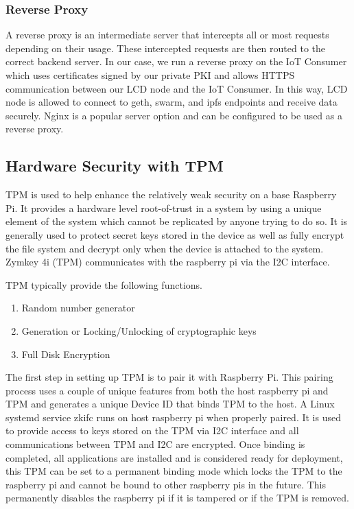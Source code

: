 \documentclass[11pt,openright]{report}
\begin{document}
\subsubsection{Reverse Proxy}
A reverse proxy is an intermediate server that intercepts all or most requests depending on their usage. These intercepted requests are then routed to the correct backend server. In our case, we run a reverse proxy on the IoT Consumer which uses certificates signed by our private PKI and allows HTTPS communication between our LCD node and the IoT Consumer. In this way, LCD node is allowed to connect to geth, swarm, and ipfs endpoints and receive data securely. Nginx is a popular server option and can be configured to be used as a reverse proxy.

\subsection{Hardware Security with TPM}
TPM is used to help enhance the relatively weak security on a base Raspberry Pi. It provides a hardware level root-of-trust in a system by using a unique element of the system which cannot be replicated by anyone trying to do so. It is generally used to protect secret keys stored in the device as well as fully encrypt the file system and decrypt only when the device is attached to the system. Zymkey 4i (TPM) communicates with the raspberry pi via the I2C interface.

TPM typically provide the following functions.
\begin{enumerate}
	\item Random number generator
	\item Generation or Locking/Unlocking of cryptographic keys
	\item Full Disk Encryption
\end{enumerate}

The first step in setting up TPM is to pair it with Raspberry Pi. This pairing process uses a couple of unique features from both the host raspberry pi and TPM and generates a unique Device ID that binds TPM to the host. A Linux systemd service zkifc runs on host raspberry pi when properly paired. It is used to provide access to keys stored on the TPM via I2C interface and all communications between TPM and I2C are encrypted. Once binding is completed, all applications are installed and is considered ready for deployment, this TPM can be set to a permanent binding mode which locks the TPM to the raspberry pi and cannot be bound to other raspberry pis in the future. This permanently disables the raspberry pi if it is tampered or if the TPM is removed.
\end{document}
